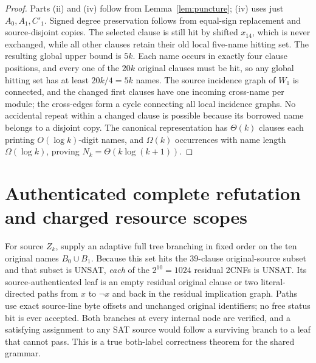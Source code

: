 \documentclass[11pt]{article}
\begin{document}
\begin{proof}
Parts (ii) and (iv) follow from Lemma~\ref{lem:puncture}; (iv) uses just $A_0,A_1,C'_1$. Signed degree preservation follows from equal-sign replacement and source-disjoint copies. The selected clause is still hit by shifted $x_{14}$, which is never exchanged, while all other clauses retain their old local five-name hitting set. The resulting global upper bound is $5k$. Each name occurs in exactly four clause positions, and every one of the $20k$ original clauses must be hit, so any global hitting set has at least $20k/4=5k$ names. The source incidence graph of $W_1$ is connected, and the changed first clauses have one incoming cross-name per module; the cross-edges form a cycle connecting all local incidence graphs. No accidental repeat within a changed clause is possible because its borrowed name belongs to a disjoint copy. The canonical representation has $\Theta(k)$ clauses each printing $O(\log k)$-digit names, and $\Omega(k)$ occurrences with name length $\Omega(\log k)$, proving $N_k=\Theta(k\log(k+1))$.\end{proof}

\section{Authenticated complete refutation and charged resource scopes}
For source $Z_k$, supply an adaptive full tree branching in fixed order on the ten original names $B_0\cup B_1$. Because this set hits the 39-clause original-source subset and that subset is UNSAT, \emph{each} of the $2^{10}=1024$ residual 2CNFs is UNSAT. Its source-authenticated leaf is an empty residual original clause or two literal-directed paths from $x$ to $\neg x$ and back in the residual implication graph. Paths use exact source-line byte offsets and unchanged original identifiers; no free status bit is ever accepted. Both branches at every internal node are verified, and a satisfying assignment to any SAT source would follow a surviving branch to a leaf that cannot pass. This is a true both-label correctness theorem for the shared grammar.
\end{document}
